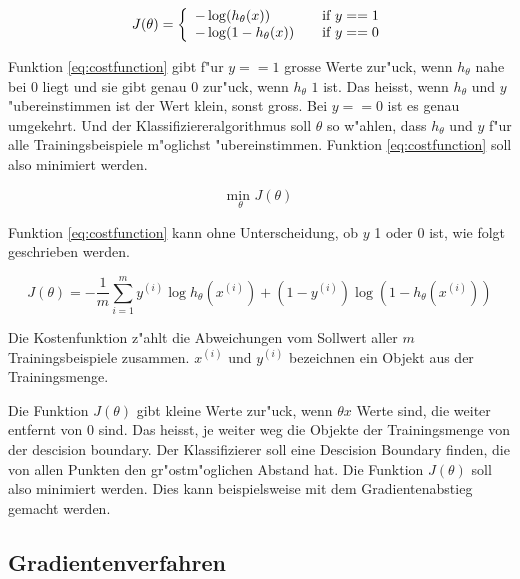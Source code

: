 \documentclass[12pt,a4paper,twoside]{article}
\begin{document}
\begin{equation}
  \label{eq:costfunction}
  J(\theta) = \left \{
    \begin{array}{l l}
      -\log(h_{\theta} (x)) & \quad \text{if $y==1$}\\
      -\log(1-h_{\theta} (x)) & \quad \text{if $y==0$}
    \end{array} \right.
\end{equation}

Funktion \ref{eq:costfunction} gibt f"ur $y==1$ grosse Werte zur"uck, wenn $h_{\theta}$ nahe bei $0$ liegt und sie gibt genau $0$ zur"uck, wenn $h_{\theta}$ $1$ ist. Das heisst, wenn $h_{\theta}$ und $y$ "ubereinstimmen ist der Wert klein, sonst gross. Bei $y==0$ ist es genau umgekehrt. Und der Klassifiziereralgorithmus soll $\theta$ so w"ahlen, dass $h_{\theta}$ und $y$  f"ur alle Trainingsbeispiele m"oglichst "ubereinstimmen. Funktion \ref{eq:costfunction} soll also minimiert werden.

\begin{equation}
  \label{eq:minimize}
  \underset{\theta}{\text{min }} J(\theta)
\end{equation}

Funktion \ref{eq:costfunction} kann ohne Unterscheidung, ob $y$ 1 oder 0 ist, wie folgt geschrieben werden. 

\begin{equation}
  \label{eq:simplecostfunction}
  J( \theta ) = - \frac{1}{m} \sum_{i=1}^m y^{(i)} \log h_{\theta}(x^{(i)}) + (1 - y^{(i)}) \log(1 - h_{\theta}(x^{(i)}))
\end{equation}

Die Kostenfunktion z"ahlt die Abweichungen vom Sollwert aller $m$ Trainingsbeispiele zusammen. $x^{(i)}$ und $y^{(i)}$ bezeichnen ein Objekt aus der Trainingsmenge.

Die Funktion $J(\theta)$ gibt kleine Werte zur"uck, wenn $\theta x$ Werte sind, die weiter entfernt von 0 sind. Das heisst, je weiter weg die Objekte der Trainingsmenge von der descision boundary. Der Klassifizierer soll eine Descision Boundary finden, die von allen Punkten den gr"ostm"oglichen Abstand hat. Die Funktion $J(\theta)$ soll also minimiert werden. Dies kann beispielsweise mit dem Gradientenabstieg gemacht werden. 

\subsection{Gradientenverfahren}
\label{sec:gradientdescent}
\end{document}
